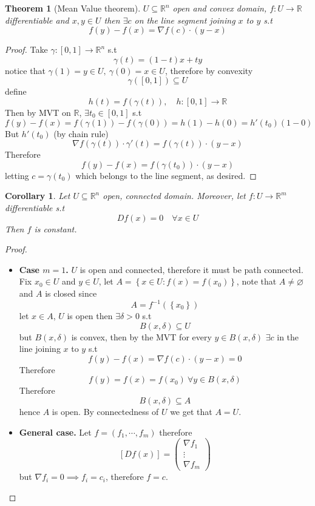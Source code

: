 \documentclass[11pt,a4paper]{article}
\theoremstyle{definition}
\theoremstyle{plain}
\newtheorem{theorem}[definition]{Theorem}
\newtheorem{corollary}[definition]{Corollary}
\theoremstyle{remark}
\newcommand{\R}{\mathbb{R}}
\renewcommand{\set}[1]{\left\{ #1 \right\}}
\begin{document}
\begin{theorem}[Mean Value theorem]
    $U \subseteq \R^n$ open and convex domain, $f \colon U \to \R$ differentiable and $x,y \in U$ then $\exists c$ on the line segment joining $x$ to $y$ s.t 
    $$f(y) - f(x) = \nabla f(c) \cdot (y-x)$$ 
\end{theorem}

\begin{proof}
    Take $\gamma \colon [0,1] \to \R^n$ s.t 
    $$\gamma(t) = (1-t) x + ty$$
    notice that $\gamma(1) = y \in U, \ \gamma(0) = x \in U$, therefore by convexity 
    $$\gamma([0,1]) \subseteq U$$
    define 
    $$h(t) = f(\gamma(t)), \quad h \colon [0,1] \to \R$$
    Then by MVT on $\R$, $\exists t_0 \in [0,1]$ s.t 
    $$f(y) - f(x) = f(\gamma(1)) - f(\gamma(0)) = h(1) - h(0) = h'(t_0) (1 - 0)$$
    But $h'(t_0)$ (by chain rule) 
    $$\nabla f(\gamma(t)) \cdot \gamma'(t) = f(\gamma(t)) \cdot (y-x)$$
    Therefore 
    $$f(y) - f(x) = f(\gamma(t_0)) \cdot (y-x)$$
    letting $c = \gamma(t_0)$ which belongs to the line segment, as desired.
\end{proof}

\begin{corollary}
    Let $U \subseteq \R^n$ open, connected domain. Moreover, let $f \colon U \to \R^m$ differentiable s.t 
    $$Df(x) = 0 \quad \forall x \in U$$
    Then $f$ is constant. 
\end{corollary}

\begin{proof}
    \begin{itemize}
        \item \textbf{Case $m=1$.} $U$ is open and connected, therefore it must be path connected. Fix $x_0 \in U$ and $y \in U$, 
        let $A = \set{x \in U \colon f(x) = f(x_0)}$, note that $A \ne \varnothing$ and $A$ is closed since 
        $$A = f^{-1} (\set{x_0})$$
        let $x \in A$, $U$ is open then $\exists \delta > 0$ s.t 
        $$B(x,\delta) \subseteq U$$
        but $B(x,\delta)$ is convex, then by the MVT for every $y \in B(x, \delta)$ $\exists c$ in the line joining $x$ to $y$ s.t 
        $$f(y) - f(x) = \nabla f(c) \cdot (y-x) = 0$$
        Therefore 
        $$f(y) = f(x) = f(x_0) \ \forall y \in B(x,\delta)$$
        Therefore 
        $$B(x,\delta) \subseteq A$$
        hence $A$ is open. By connectedness of $U$ we get that $A = U$. 

        \item \textbf{General case.} Let $f = (f_1, \cdots, f_m)$ therefore 
        $$[Df(x)] = \begin{pmatrix}
            \nabla f_1 \\ \vdots \\ \nabla f_m
        \end{pmatrix}$$
        but $\nabla f_i = 0 \implies f_i = c_i$, therefore 
        $f = c$. 
    \end{itemize}
\end{proof}
\end{document}
